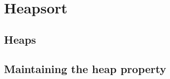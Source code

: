 \chapter{Heapsort}
\section{Heaps}
\subsection{}

\subsection{}

\subsection{}

\subsection{}

\subsection{}

\subsection{}

\subsection{}

\section{Maintaining the heap property}
\subsection{}

\subsection{}

\subsection{}

\subsection{}

